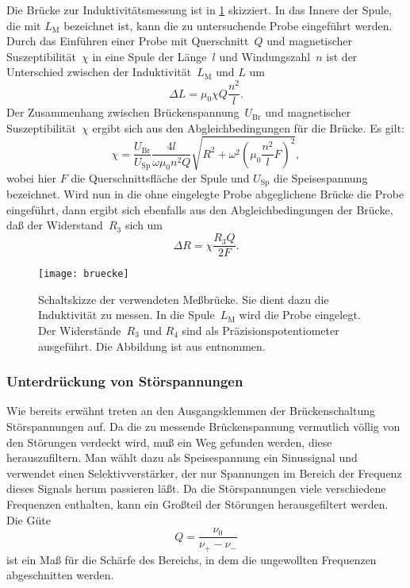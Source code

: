 Die Brücke zur Induktivitätsmessung ist in \cref{fig:bruecke}
skizziert.  In das Innere der Spule, die mit $L_\text{M}$ bezeichnet ist,
kann die zu untersuchende Probe eingeführt werden.  Durch das Einführen
einer Probe mit Querschnitt~$Q$ und magnetischer Suszeptibilität~$\chi$
in eine Spule der Länge~$l$ und Windungszahl~$n$ ist der Unterschied
zwischen der Induktivität~$L_\text{M}$ und $L$ um
\begin{equation}
  \Delta L = \mu_0 \chi Q \frac{n^2}{l}.
\end{equation}
Der Zusammenhang zwischen Brückenspannung~$U_\text{Br}$ und magnetischer
Suszeptibilität~$\chi$ ergibt sich aus den Abgleichbedingungen für die
Brücke.  Es gilt:
\begin{equation}
  \label{eq:chi-spannungen}
  \chi = \frac{U_\text{Br}}{U_\text{Sp}} \frac{4 l}{\omega \mu_0 n^2 Q}
  \sqrt{R^2 + \omega^2 \left(\mu_0 \frac{n^2}{l} F\right)^2},
\end{equation}
wobei hier $F$ die Querschnittsfläche der Spule und $U_\text{Sp}$ die
Speisespannung bezeichnet.  Wird nun in die ohne eingelegte Probe
abgeglichene Brücke die Probe eingeführt, dann ergibt sich ebenfalls aus
den Abgleichbedingungen der Brücke, daß der Widerstand~$R_3$ sich um
\begin{equation}
  \label{eq:delta-r}
  \Delta R = \chi \frac{R_3 Q}{2 F}.
\end{equation}

\begin{figure}
  \centering
  \texttt{[image: bruecke]}
  \caption{Schaltskizze der verwendeten Meßbrücke.  Sie dient dazu die
    Induktivität zu messen.  In die Spule~$L_\text{M}$ wird die Probe
    eingelegt. Der Widerstände~$R_3$ und $R_4$ sind als
    Präzisionspotentiometer ausgeführt.  Die Abbildung ist aus
    \textcite{v606} entnommen.}
  \label{fig:bruecke}
\end{figure}

\subsubsection{Unterdrückung von Störspannungen}

Wie bereits erwähnt treten an den Ausgangsklemmen der Brückenschaltung
Störspannungen auf.  Da die zu messende Brückenspannung vermutlich
völlig von den Störungen verdeckt wird, muß ein Weg gefunden werden,
diese herauszufiltern.  Man wählt dazu als Speisespannung ein
Sinussignal und verwendet einen Selektivverstärker, der nur Spannungen
im Bereich der Frequenz dieses Signals herum passieren läßt.  Da die
Störspannungen viele verschiedene Frequenzen enthalten, kann ein
Großteil der Störungen herausgefiltert werden.  Die Güte
\begin{equation}
  \label{eq:guete}
  Q = \frac{\nu_0}{\nu_+ - \nu_-}
\end{equation}
ist ein Maß für die Schärfe des Bereichs, in dem die ungewollten
Frequenzen abgeschnitten werden.

